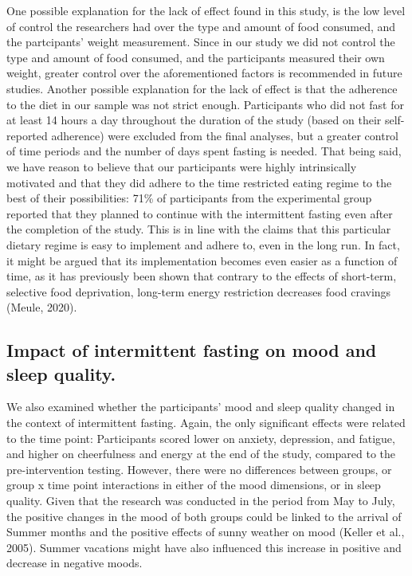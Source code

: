 \documentclass[authordate, empirical]{jote-new-article}
\begin{document}
One possible explanation for the lack of effect found in this study, is the low level of control the researchers had over the type and amount of food consumed, and the partcipants' weight measurement. Since in our study we did not control the type and amount of food consumed, and the participants measured their own weight, greater control over the aforementioned factors is recommended in future studies. Another possible explanation for the lack of effect is that the adherence to the diet in our sample was not strict enough. Participants who did not fast for at least 14 hours a day throughout the duration of the study (based on their self-reported adherence) were excluded from the final analyses, but a greater control of time periods and the number of days spent fasting is needed. That being said, we have reason to believe that our participants were highly intrinsically motivated and that they did adhere to the time restricted eating regime to the best of their possibilities: 71\% of participants from the experimental group reported that they planned to continue with the intermittent fasting even after the completion of the study. This is in line with the claims that this particular dietary regime is easy to implement and adhere to, even in the long run. In fact, it might be argued that its implementation becomes even easier as a function of time, as it has previously been shown that contrary to the effects of short-term, selective food deprivation, long-term energy restriction decreases food cravings (Meule, 2020).



\subsection{Impact of intermittent fasting on mood and sleep quality.}



We also examined whether the participants' mood and sleep quality changed in the context of intermittent fasting. Again, the only significant effects were related to the time point: Participants scored lower on anxiety, depression, and fatigue, and higher on cheerfulness and energy at the end of the study, compared to the pre-intervention testing. However, there were no differences between groups, or group x time point interactions in either of the mood dimensions, or in sleep quality. Given that the research was conducted in the period from May to July, the positive changes in the mood of both groups could be linked to the arrival of Summer months and the positive effects of sunny weather on mood (Keller et al., 2005). Summer vacations might have also influenced this increase in positive and decrease in negative moods.
\end{document}
